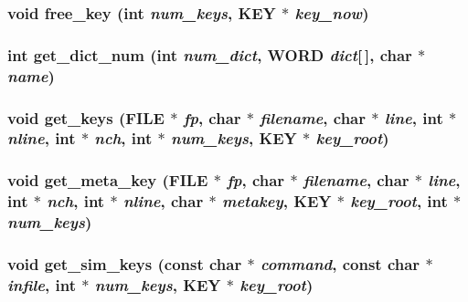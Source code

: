 \subsubsection{\setlength{\rightskip}{0pt plus 5cm}void free\_\-key (int {\em num\_\-keys}, {\bf KEY} $\ast$ {\em key\_\-now})}\label{md__char_8c_2fbbbab18403570cbf51d1ab794db539}


\subsubsection{\setlength{\rightskip}{0pt plus 5cm}int get\_\-dict\_\-num (int {\em num\_\-dict}, {\bf WORD} {\em dict}[$\,$], char $\ast$ {\em name})}\label{md__char_8c_330c7fbb9aa4f8ba98ca797555912c17}


\subsubsection{\setlength{\rightskip}{0pt plus 5cm}void get\_\-keys (FILE $\ast$ {\em fp}, char $\ast$ {\em filename}, char $\ast$ {\em line}, int $\ast$ {\em nline}, int $\ast$ {\em nch}, int $\ast$ {\em num\_\-keys}, {\bf KEY} $\ast$ {\em key\_\-root})}\label{md__char_8c_c258ea686aa9fefdddb270c2eb6fdcf4}


\subsubsection{\setlength{\rightskip}{0pt plus 5cm}void get\_\-meta\_\-key (FILE $\ast$ {\em fp}, char $\ast$ {\em filename}, char $\ast$ {\em line}, int $\ast$ {\em nch}, int $\ast$ {\em nline}, char $\ast$ {\em metakey}, {\bf KEY} $\ast$ {\em key\_\-root}, int $\ast$ {\em num\_\-keys})}\label{md__char_8c_4641500cc258afc7065d49ff2a53f00a}


\subsubsection{\setlength{\rightskip}{0pt plus 5cm}void get\_\-sim\_\-keys (const char $\ast$ {\em command}, const char $\ast$ {\em infile}, int $\ast$ {\em num\_\-keys}, {\bf KEY} $\ast$ {\em key\_\-root})}\label{md__char_8c_ad85edd45abc9b8d321c28a765ec2564}


